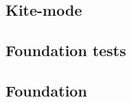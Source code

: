 
\subsection{Kite-mode}
\label{kite-mode}


\subsection{Foundation tests}
\label{sec:foundation-tests}


\subsection{Foundation}
\label{foundation}

